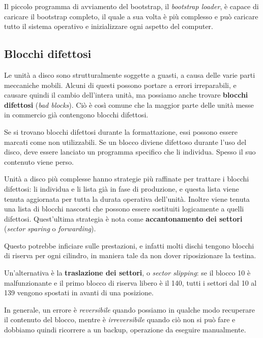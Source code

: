         Il piccolo programma di avviamento del bootstrap, il \textit{bootstrap loader}, è capace di caricare il bootstrap completo, il quale a sua volta è più complesso e può caricare tutto il sistema operativo e inizializzare ogni aspetto del computer.
        
    \subsection{Blocchi difettosi}
        Le unità a disco sono strutturalmente soggette a guasti, a causa delle varie parti meccaniche mobili. Alcuni di questi possono portare a errori irreparabili, e causare quindi il cambio dell'intera unità, ma possiamo anche trovare \textbf{blocchi difettosi} (\textit{bad blocks}). Ciò è così comune che la maggior parte delle unità messe in commercio già contengono blocchi difettosi.
        
        Se si trovano blocchi difettosi durante la formattazione, essi possono essere marcati come non utilizzabili. Se un blocco diviene difettoso durante l'uso del disco, deve essere lanciato un programma specifico che li individua. Spesso il suo contenuto viene perso.
        
        Unità a disco più complesse hanno strategie più raffinate per trattare i blocchi difettosi: li individua e li lista già in fase di produzione, e questa lista viene tenuta aggiornata per tutta la durata operativa dell'unità. Inoltre viene tenuta una lista di blocchi nascosti che possono essere sostituiti logicamente a quelli difettosi. Quest'ultima strategia è nota come \textbf{accantonamento dei settori} (\textit{sector sparing} o \textit{forwarding}).
        
        Questo potrebbe inficiare sulle prestazioni, e infatti molti dischi tengono blocchi di riserva per ogni cilindro, in maniera tale da non dover riposizionare la testina.
        
        Un'alternativa è la \textbf{traslazione dei settori}, o \textit{sector slipping}: se il blocco 10 è malfunzionante e il primo blocco di riserva libero è il 140, tutti i settori dal 10 al 139 vengono spostati in avanti di una posizione.
        
        In generale, un errore è \textit{reversibile} quando possiamo in qualche modo recuperare il contenuto del blocco, mentre è \textit{irreversibile} quando ciò non si può fare e dobbiamo quindi ricorrere a un backup, operazione da eseguire manualmente.
        
